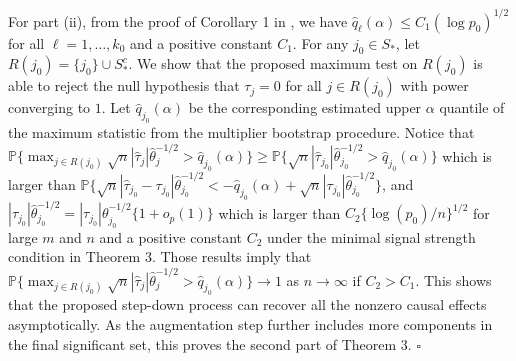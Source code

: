 \documentclass[12pt]{article}
\numberwithin{equation}{section}
\begin{document}
For part (ii), from the proof of Corollary 1 in \cite{ChangQiuYao_2016}, we have
$\hat{q}_{\ell}(\alpha)\leq C_1 (\log p_0)^{1/2}$ for all $\ell = 1, \ldots, k_0$ and a positive constant $C_1$.
For any $j_0 \in S_{\ast}$, let $R(j_0) = \{j_0\} \cup S_{\ast}^{c}$.
We show that the proposed maximum test on $R(j_0)$ is able to reject the null hypothesis that $\tau_{j} = 0$ for all $j \in R(j_0)$ with power converging to $1$. 
Let $\hat{q}_{j_0}(\alpha)$ be the corresponding estimated upper $\alpha$ quantile of the maximum statistic from the multiplier bootstrap procedure.
Notice that $\mathbb{P}\big\{ \max_{j \in R(j_0)} \sqrt{n} |\hat{\tau}_{j}| \hat{\theta}_j^{-1/2} > \hat{q}_{j_0}(\alpha) \big\}
\geq \mathbb{P}\big\{ \sqrt{n} |\hat{\tau}_{j_0}| \hat{\theta}_{j_0}^{-1/2} > \hat{q}_{j_0}(\alpha) \big\}$ which is larger than $\mathbb{P}\big\{ \sqrt{n} |\hat{\tau}_{j_0} - \tau_{j_0}| \hat{\theta}_{j_0}^{-1/2} < - \hat{q}_{j_0}(\alpha) + \sqrt{n}|\tau_{j_0}| \hat{\theta}_{j_0}^{-1/2} \big\}$, and 
$|\tau_{j_0}| \hat{\theta}_{j_0}^{-1/2} = |\tau_{j_0}| \theta_{j_0}^{-1/2} \{1 + o_p(1)\}$ which is larger than $C_{2} \{\log (p_0) / n\}^{1/2}$ for large $m$ and $n$ and a positive constant $C_2$ under the minimal signal strength condition in Theorem 3.
Those results imply that $\mathbb{P}\big\{ \max_{j \in R(j_0)} \sqrt{n} |\hat{\tau}_{j}| \hat{\theta}_j^{-1/2} > \hat{q}_{j_0}(\alpha) \big\} \to 1$ as $n \to \infty$ if $C_2 > C_1$. 
This shows that the proposed step-down process can recover all the nonzero causal effects asymptotically. As the augmentation step further includes more components in the final significant set, this proves the second part of Theorem 3. $\square$
\end{document}
